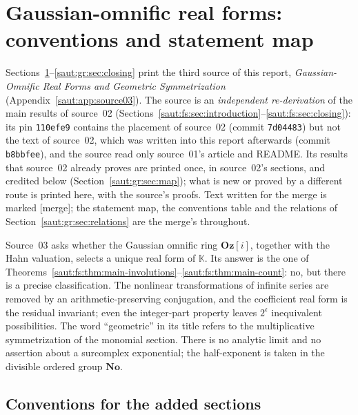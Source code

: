 \documentclass[11pt]{article}
\theoremstyle{definition}
\theoremstyle{remark}
\newcommand{\No}{\mathbf{No}}
\newcommand{\K}{\mathbb K}
\newcommand{\Oz}{\mathbf{Oz}}
\newcommand{\cc}{\mathfrak c}
\newcommand{\mergetag}{\textup{[merge]}}
\numberwithin{equation}{section}
\begin{document}
\section{Gaussian-omnific real forms: conventions and statement map}\label{saut:gr:sec:introduction}

Sections~\ref{saut:gr:sec:introduction}--\ref{saut:gr:sec:closing} print the third
source of this report, \emph{Gaussian-Omnific Real Forms and Geometric
Symmetrization} (Appendix~\ref{saut:app:source03}). The source is an
\emph{independent re-derivation} of the main results of source~02
(Sections~\ref{saut:fs:sec:introduction}--\ref{saut:fs:sec:closing}): its pin
\texttt{110efe9} contains the placement of source~02 (commit \texttt{7d04483}) but
not the text of source~02, which was written into this report afterwards (commit
\texttt{b8bbfee}), and the source read only source~01's article and README. Its
results that source~02 already proves are printed once, in source~02's sections,
and credited below (Section~\ref{saut:gr:sec:map}); what is new or proved by a
different route is printed here, with the source's proofs. Text written for the
merge is marked \mergetag; the statement map, the conventions table and the
relations of Section~\ref{saut:gr:sec:relations} are the merge's throughout.

Source~03 asks whether the Gaussian omnific ring $\Oz[i]$, together with the
Hahn valuation, selects a unique real form of $\K$. Its answer is the one of
Theorems~\ref{saut:fs:thm:main-involutions}--\ref{saut:fs:thm:main-count}: no, but
there is a precise classification. The nonlinear transformations of infinite
series are removed by an arithmetic-preserving conjugation, and the coefficient
real form is the residual invariant; even the integer-part property leaves
$2^{\cc}$ inequivalent possibilities. The word ``geometric'' in its title refers to
the multiplicative symmetrization of the monomial section. There is no analytic
limit and no assertion about a surcomplex exponential; the half-exponent is taken
in the divisible ordered group $\No$.

\subsection{Conventions for the added sections}\label{saut:gr:sec:conventions}
\end{document}
